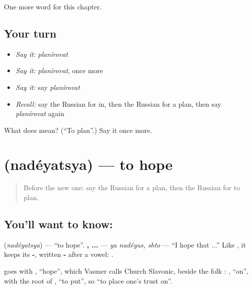 \begin{grammarlens}[title={What you've built}]
One more word for this chapter.
\end{grammarlens}

\subsection*{Your turn}
\begin{itemize}
\raggedright
  \item \emph{Say it:} \emph{planírovat}
  \item \emph{Say it:} \emph{planírovat}, once more
  \item \emph{Say it:} say \emph{planírovat}
  \item \emph{Recall:} say the Russian for in, then the Russian for a plan, then say \emph{planírovat} again
\end{itemize}

\begin{tcolorbox}[breakable,colback=teal!4,colframe=teal!35!black,title={Before you move on}]
What does  mean? (\textquotedblleft{}To plan\textquotedblright{}.) Say it once more.
\end{tcolorbox}
\section[\texorpdfstring{\ru{надеяться} (nadéyatsya)}{надеяться (nadéyatsya)}]{ (nadéyatsya) — to hope}

\label{lesson:RU-C138-nadeyatsya}



\begin{quote}
Before the new one: say the Russian for a plan, then the Russian for to plan.
\end{quote}

\subsection*{You'll want to know: }
\textbf{} (\emph{nadéyatsya}) — \textquotedblleft{}to hope\textquotedblright{}. \textbf{ ,  ...} — \emph{ya nadéyus, shto} — \textquotedblleft{}I hope that ...\textquotedblright{} Like \textbf{}, it keeps its \textbf{-}, written \textbf{-} after a vowel: \textbf{}.

\begin{cousinweb}
\textbf{} goes with \emph{}, \textquotedblleft{}hope\textquotedblright{}, which Vasmer calls Church Slavonic, beside the folk \emph{}: \emph{}, \textquotedblleft{}on\textquotedblright{}, with the root of \emph{}, \textquotedblleft{}to put\textquotedblright{}, so \textquotedblleft{}to place one's trust on\textquotedblright{}.
\end{cousinweb}

